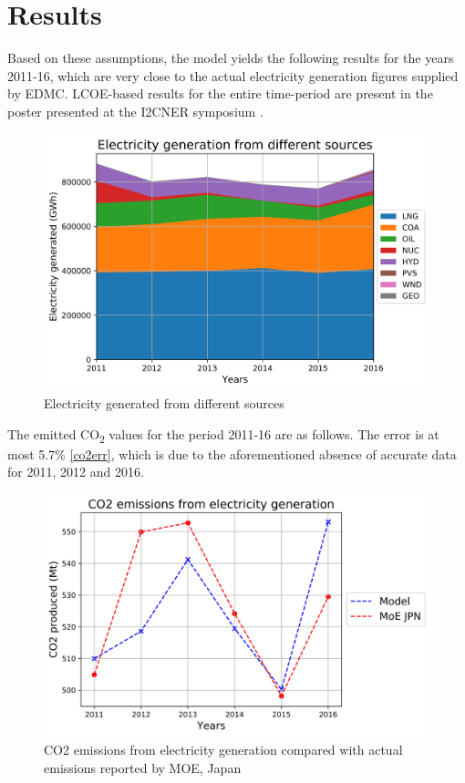 \documentclass[14pt,a4paper]{article} %
\begin{document}
\section{Results}

Based on these assumptions, the model yields the following results for the years 2011-16, which are very close to the actual electricity generation figures supplied by \gls{EDMC}. \gls{LCOE}-based results for the entire time-period are present in the poster presented at the \gls{I2CNER} symposium \cite{chaube_dynamic_2019}.

\begin{figure}[H]
\centering
\includegraphics[scale=0.6]{elc-2016}
\caption{Electricity generated from different sources}
\label{elcic}
\end{figure}

The emitted CO\textsubscript{2} values for the period 2011-16 are as follows. The error is at most 5.7\% \ref{co2err}, which is due to the aforementioned absence of accurate data for 2011, 2012 and 2016. 

\begin{figure}[H]
\centering
\includegraphics[scale=0.6]{co2-2016}
\caption{CO2 emissions from electricity generation compared with actual emissions reported by \gls{MOE}, Japan}
\label{co2ic}
\end{figure}
\end{document}
